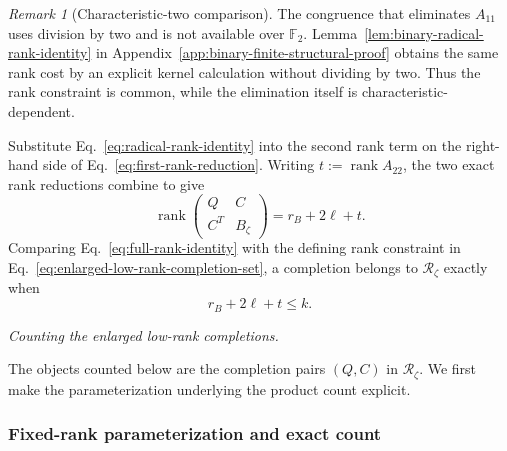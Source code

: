 \documentclass[11pt]{article}
\newcommand{\F}{\mathbb F}
\newcommand{\rank}{\operatorname{rank}}
\newcommand{\1}{\mathbf 1}
\theoremstyle{plain}
\theoremstyle{definition}
\theoremstyle{remark}
\newtheorem{remark}[theorem]{Remark}
\begin{document}
\begin{remark}[Characteristic-two comparison]
The congruence that eliminates $A_{11}$ uses division by two and is not
available over $\F_2$.  Lemma~\ref{lem:binary-radical-rank-identity} in
Appendix~\ref{app:binary-finite-structural-proof} obtains the same rank cost
by an explicit kernel calculation without dividing by two.  Thus the rank constraint is common, while the elimination itself is
characteristic-dependent.
\end{remark}

Substitute Eq.~\eqref{eq:radical-rank-identity} into the second rank term on
the right-hand side of Eq.~\eqref{eq:first-rank-reduction}.  Writing $t:=\rank A_{22}$, the two exact rank reductions combine to give
\begin{equation}
 \rank\begin{pmatrix}Q&C\\C^T&B_{\zeta}\end{pmatrix}
 =r_B+2\ell+t.
 \label{eq:full-rank-identity}
\end{equation}
Comparing Eq.~\eqref{eq:full-rank-identity} with the defining rank constraint
in Eq.~\eqref{eq:enlarged-low-rank-completion-set}, a completion belongs to
$\mathcal R_{\zeta}$ exactly when
\begin{equation}
 r_B+2\ell+t\le k.
 \label{eq:completion-rank-budget}
\end{equation}

\medskip\noindent\emph{Counting the enlarged low-rank completions.}\par
The objects counted below are the completion pairs $(Q,C)$ in
$\mathcal R_{\zeta}$.  We first make the parameterization underlying the
product count explicit.

\subsubsection{Fixed-rank parameterization and exact count}
\label{subsubsec:odd-fixed-rank-parameterization}
\end{document}

